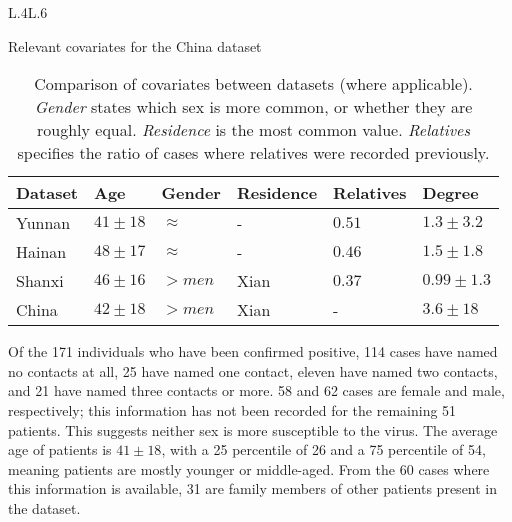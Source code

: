 \begin{table}
\begin{tabularx}{\linewidth}{L{.4\linewidth}L{.6\linewidth}}
		\hline
	\end{tabularx}
	\caption{Relevant covariates for the China dataset}
	\label{tab:china_covariates}
	\begin{tabularx}{\linewidth}{XXXXXX}
		\hline
		\textbf{Dataset} & \textbf{Age} & \textbf{Gender} & \textbf{Residence} & \textbf{Relatives} & \textbf{Degree}\\
		\hline
		Yunnan & $41\pm18$ & $\approx$ & - & $0.51$ & $1.3\pm3.2$\\
		Hainan & $48\pm17$ & $\approx$ & - & $0.46$ & $1.5\pm1.8$\\
		Shanxi & $46\pm16$ & $>men$ & Xian & $0.37$ & $0.99\pm1.3$\\
		China & $42\pm18$ & $>men$ & Xian & - & $3.6\pm18$\\
		\hline
	\end{tabularx}
	\caption{Comparison of covariates between datasets (where applicable). \emph{Gender} states which sex is more common, or whether they are roughly equal. \emph{Residence} is the most common value. \emph{Relatives} specifies the ratio of cases where relatives were recorded previously.}
	\label{tab:cov_comp}
\end{table}

Of the 171 individuals who have been confirmed positive, 114 cases have named no contacts at all, 25 have named one contact, eleven have named two contacts, and 21 have named three contacts or more. 58 and 62 cases are female and male, respectively; this information has not been recorded for the remaining 51 patients. This suggests neither sex is more susceptible to the virus. The average age of patients is $41\pm18$, with a 25 percentile of 26 and a 75 percentile of 54, meaning patients are mostly younger or middle-aged. From the 60 cases where this information is available, 31 are family members of other patients present in the dataset. 

